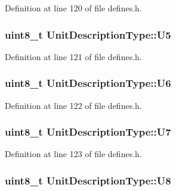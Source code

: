 Definition at line 120 of file defines.\+h.

\subsubsection[{\texorpdfstring{U5}{U5}}]{\setlength{\rightskip}{0pt plus 5cm}uint8\+\_\+t Unit\+Description\+Type\+::\+U5}\hypertarget{structUnitDescriptionType_ab11845623074981c46cbe7af4a5964cd}{}\label{structUnitDescriptionType_ab11845623074981c46cbe7af4a5964cd}


Definition at line 121 of file defines.\+h.

\subsubsection[{\texorpdfstring{U6}{U6}}]{\setlength{\rightskip}{0pt plus 5cm}uint8\+\_\+t Unit\+Description\+Type\+::\+U6}\hypertarget{structUnitDescriptionType_a8c7c9b56c879d736a289183fcee17b84}{}\label{structUnitDescriptionType_a8c7c9b56c879d736a289183fcee17b84}


Definition at line 122 of file defines.\+h.

\subsubsection[{\texorpdfstring{U7}{U7}}]{\setlength{\rightskip}{0pt plus 5cm}uint8\+\_\+t Unit\+Description\+Type\+::\+U7}\hypertarget{structUnitDescriptionType_a9b90dfa70ea1e381a0ea6032ca804ad6}{}\label{structUnitDescriptionType_a9b90dfa70ea1e381a0ea6032ca804ad6}


Definition at line 123 of file defines.\+h.

\subsubsection[{\texorpdfstring{U8}{U8}}]{\setlength{\rightskip}{0pt plus 5cm}uint8\+\_\+t Unit\+Description\+Type\+::\+U8}\hypertarget{structUnitDescriptionType_adea079c655e18cac88ad05a8243f22f8}{}\label{structUnitDescriptionType_adea079c655e18cac88ad05a8243f22f8}


